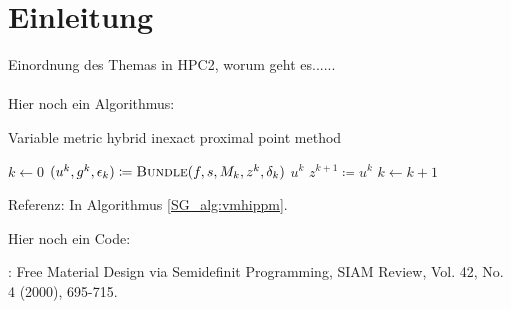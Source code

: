 
\section{Einleitung}
Einordnung des Themas in HPC2, worum geht es...... \\
\\
Hier noch ein Algorithmus:

\begin{algorithm}[ht]
\caption{Variable metric hybrid inexact proximal point
method}\label{SG_alg:vmhippm}
\begin{algorithmic}[1]
 \State $k \gets 0$
   \State $(u^k, g^k, \epsilon_k) \coloneqq \Call{Bundle}{f, s, M_k,
z^k, \delta_k}$ 
\State \Return $u^k$  \EndIf
   \State $z^{k+1} \coloneqq u^k$ 
   \State $k \gets k + 1$
 \EndWhile
\EndFunction
\end{algorithmic}
\end{algorithm}

Referenz: In Algorithmus \ref{SG_alg:vmhippm}.

Hier noch ein Code: 




\begin{thebibliography}{2}
: Free Material Design via Semidefinit
Programming, SIAM Review, Vol. 42, No. 4 (2000), 695-715.
\end{thebibliography}